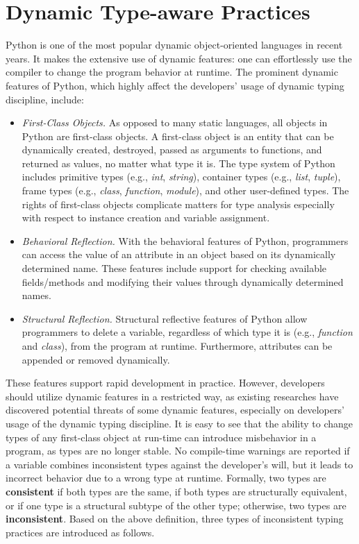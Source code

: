 \section{Dynamic Type-aware Practices}\label{sec:def}

Python is one of the most popular dynamic object-oriented languages in recent years. It makes the extensive use of dynamic features: one can effortlessly use the compiler to change the program behavior at runtime. The prominent dynamic features of Python, which highly affect the developers' usage of dynamic typing discipline, include:
\begin{itemize}
\item 
\emph{First-Class Objects.} As opposed to many static languages, all objects in Python are first-class objects. A first-class object is an entity that can be dynamically created, destroyed, passed as arguments to functions, and returned as values, no matter what type it is. The type system of Python includes primitive types (e.g., \textit{int}, \textit{string}), container types (e.g., \textit{list}, \textit{tuple}), frame types (e.g., \textit{class}, \textit{function}, \textit{module}), and other user-defined types. The rights of first-class objects complicate matters for type analysis especially with respect to instance creation and variable assignment. 
\item 
\emph{Behavioral Reflection.} With the behavioral features of Python, programmers can access the value of an attribute in an object based on its dynamically determined name. These features include support for checking available fields/methods and modifying their values through dynamically determined names.
\item 
\emph{Structural Reflection.} Structural reflective features of Python allow programmers to delete a variable, regardless of which type it is (e.g., \textit{function} and \textit{class}), from the program at runtime. Furthermore, attributes can be appended or removed dynamically.
\end{itemize}

These features support rapid development in practice. However, developers should utilize dynamic features in a restricted way, as existing researches have discovered potential threats of some dynamic features, especially on developers' usage of the dynamic typing discipline\cite{b1,b2}. It is easy to see that the ability to change types of any first-class object at run-time can introduce misbehavior in a program, as types are no longer stable. No compile-time warnings are reported if a variable combines inconsistent types against the developer's will, but it leads to incorrect behavior due to a wrong type at runtime. Formally, two types are \textbf{consistent} if both types are the same, if both types are structurally equivalent, or if one type is a structural subtype of the other type; otherwise, two types are \textbf{inconsistent}\cite{b1}. Based on the above definition, three types of inconsistent typing practices are introduced as follows.

